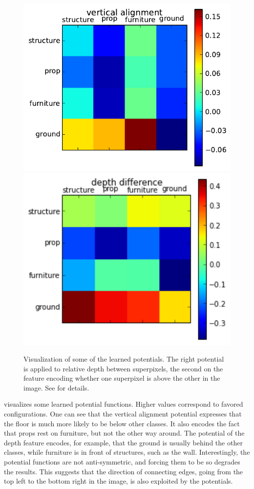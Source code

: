 \documentclass[a4paper, 10pt, conference]{ieeeconf}      %
\begin{document}
\begin{figure}
    \begin{center}
        \includegraphics[width=.45\linewidth]{images/vertical_alignment}\vspace{1mm}
    \includegraphics[width=.45\linewidth]{images/depth_difference}
    \end{center}
    \caption{%
        Visualization of some of the learned potentials. The right potential is
        applied to relative depth between superpixels, the second on the
        feature encoding whether one superpixel is above the other in the
        image. See  for details.
    }
\end{figure}

 visualizes some learned potential functions.
Higher values correspond to favored configurations. One can see that the
vertical alignment potential expresses that the floor is much more likely to be below
other classes. It also encodes the fact that props
rest on furniture, but not the other way around.
The potential of the depth feature encodes, for example, that the ground
is usually behind the other classes, while furniture is in front of structures,
such as the wall.
Interestingly, the potential functions are not anti-symmetric, and forcing them to be so
degrades the results. This suggests that the direction of connecting edges, going from
the top left to the bottom right in the image, is also exploited by the potentials.
\end{document}

